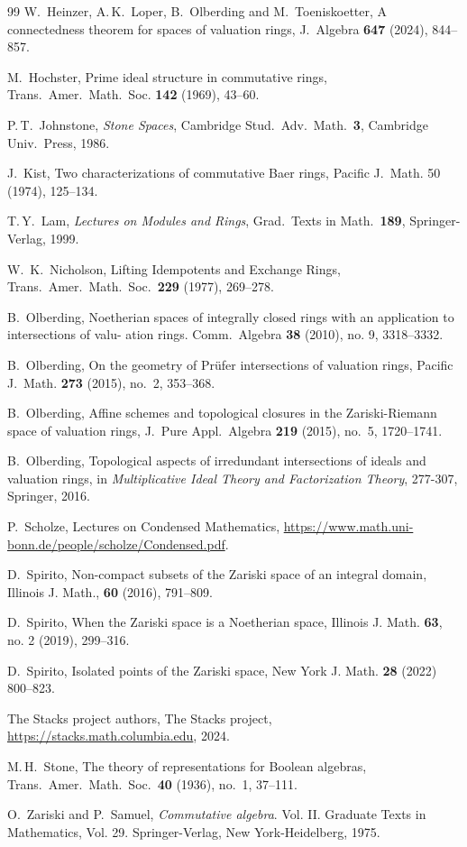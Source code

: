 \documentclass[11pt]{amsart}
\theoremstyle{definition}
\begin{document}
\begin{thebibliography}{99}
 W.~Heinzer, A.\,K.~Loper, B.~Olberding and M.~Toeniskoetter, A connectedness theorem for spaces of valuation rings, J.~Algebra {\bf 647} (2024), 844--857.

 M.~Hochster, {Prime ideal structure in commutative rings}, Trans.~Amer.~Math.~Soc. \textbf{142} (1969), 43--60.

 P.\,T.~Johnstone, {\it Stone Spaces}, Cambridge Stud.~Adv.~Math.~\textbf{3}, Cambridge Univ.~Press, 1986.

 J.~Kist, Two characterizations of commutative Baer rings, Pacific J.~Math. 50 (1974), 125--134.

 T.\,Y.~Lam, {\it Lectures on Modules and Rings}, Grad.~Texts in Math.~\textbf{189}, Springer-Verlag, 1999. 

 W.~K.~Nicholson, Lifting Idempotents and Exchange Rings, Trans.~Amer.~Math.~Soc.~\textbf{229} (1977), 269--278.

B.~Olberding, Noetherian spaces of integrally closed rings with an application to intersections of valu-
ation rings. Comm.~Algebra {\bf 38} (2010), no. 9, 3318--3332.

 B.~Olberding, 
On the geometry of Pr\"ufer intersections of valuation rings, Pacific J.~Math. {\bf 273} (2015), no.~2, 
353--368.
 
 B.~Olberding, Affine schemes and topological closures in the Zariski-Riemann space of valuation rings, J.~Pure Appl.~Algebra {\bf 219} (2015), no.~5, 1720--1741.

 B.~Olberding, Topological aspects of irredundant intersections of ideals and valuation rings, in {\it Multiplicative Ideal Theory and Factorization Theory}, 277-307, Springer, 2016.

 P.~Scholze, Lectures on Condensed Mathematics, \url{https://www.math.uni-bonn.de/people/scholze/Condensed.pdf}.

 D.~Spirito, Non-compact subsets of the Zariski space of an integral domain, Illinois J. Math., {\bf 60} (2016),
791--809.

 D.~Spirito, When the Zariski space is a Noetherian space, Illinois J. Math. {\bf 63}, no. 2 (2019), 299--316.
 
 D.~Spirito, Isolated points of the Zariski space, New York J. Math. {\bf 28} (2022) 800--823.

 The {Stacks project authors},
  {The Stacks project},
 {\url{https://stacks.math.columbia.edu}},
  2024.

 M.\,H.~Stone, {The theory of representations for {B}oolean algebras}, Trans.~Amer.~Math.~Soc.~\textbf{40} (1936), no.~1, 37--111.

 O.~Zariski and P.~Samuel, {\it Commutative algebra}. Vol. II. Graduate Texts in Mathematics, Vol. 29. Springer-Verlag, New York-Heidelberg, 1975.


\end{thebibliography}
\end{document}
